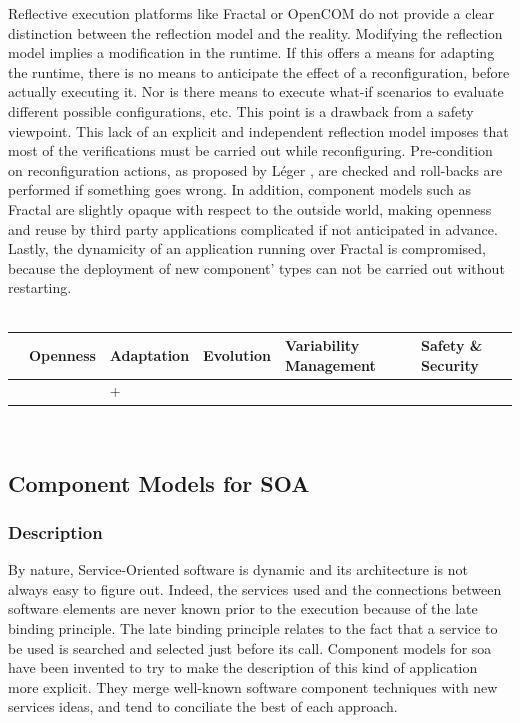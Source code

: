 Reflective execution platforms like Fractal or OpenCOM \cite{Blair:2004} do not provide a clear distinction between the reflection model and the reality. 
Modifying the reflection model implies a modification in the runtime. If this offers a means for adapting the runtime, there is no means to anticipate the effect of a reconfiguration, before actually executing it. Nor is there means to execute what-if scenarios to evaluate different possible configurations, etc. This point is a drawback from a safety viewpoint.
This lack of an explicit and independent reflection model imposes that most of the verifications must be carried out while reconfiguring. Pre-condition on reconfiguration actions, as proposed by L\'eger \cite{Leger:2007}, are checked and roll-backs are performed if something goes wrong.
In addition, component models such as Fractal are slightly opaque with respect to the outside world, making openness and reuse by third party applications complicated if not anticipated in advance. Lastly, the dynamicity of an application running over Fractal is compromised, because the deployment of new component' types can not be carried out without restarting.\\
 \\
\begin{tabular}{ >{\centering}m{}| >{\centering}m{} >{\centering}m{}| >{\centering}m{} >{\centering}m{}| >{\centering\arraybackslash}m{}}
{\tiny Interoperability} & {\tiny Openness} & {\tiny Adaptation} & {\tiny Evolution} & {\tiny Variability Management} & {\tiny Safety \& Security}\\
 \hline
  &  & + &  &  &  \\ 
  \hline
\end{tabular}\\


\newpage
\subsection{Component Models for SOA}

\subsubsection{Description}

By nature, Service-Oriented software is dynamic and its architecture is not always easy to figure out. Indeed, the services used and the connections between software elements are never known prior to the execution because of the late binding principle. The late binding principle relates to the fact that a service to be used is searched and selected just before its call. Component models for \gls{soa} have been invented to try to make the description of this kind of application more explicit. They merge well-known software component techniques with new services ideas, and tend to conciliate the best of each approach.\\

